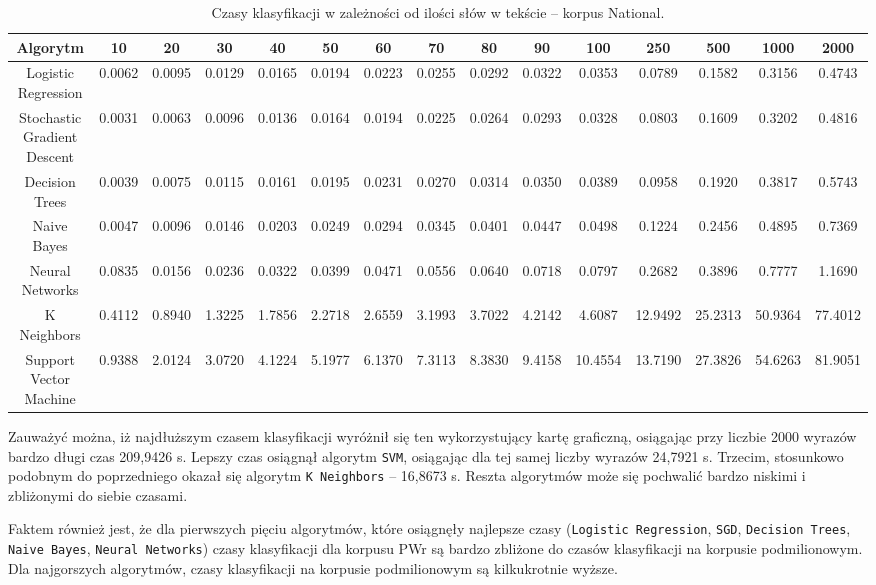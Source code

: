 \begin{landscape}
	\begin{table}[H]
		\centering
		\caption{Czasy klasyfikacji w zależności od ilości słów w tekście -- korpus National.}
		\begin{tabular}{ccccccccccccccc}
			\toprule
			\textbf{Algorytm} & \textbf{10} & \textbf{20} & \textbf{30} & \textbf{40} & \textbf{50} & \textbf{60} & \textbf{70} & \textbf{80} & \textbf{90} & \textbf{100} & \textbf{250} & \textbf{500} & \textbf{1000} & \textbf{2000} \\
			\midrule
			Logistic Regression & 0.0062 & 0.0095 & 0.0129 & 0.0165 & 0.0194 & 0.0223 & 0.0255 & 0.0292 & 0.0322 & 0.0353 & 0.0789 & 0.1582 & 0.3156 & 0.4743 \\
			Stochastic Gradient Descent & 0.0031 & 0.0063 & 0.0096 & 0.0136 & 0.0164 & 0.0194 & 0.0225 & 0.0264 & 0.0293 & 0.0328 & 0.0803 & 0.1609 & 0.3202 & 0.4816 \\
			Decision Trees & 0.0039 & 0.0075 & 0.0115 & 0.0161 & 0.0195 & 0.0231 & 0.0270 & 0.0314 & 0.0350 & 0.0389 & 0.0958 & 0.1920 & 0.3817 & 0.5743 \\
			Naive Bayes & 0.0047 & 0.0096 & 0.0146 & 0.0203 & 0.0249 & 0.0294 & 0.0345 & 0.0401 & 0.0447 & 0.0498 & 0.1224 & 0.2456 & 0.4895 & 0.7369 \\
			Neural Networks & 0.0835 & 0.0156 & 0.0236 & 0.0322 & 0.0399 & 0.0471 & 0.0556 & 0.0640 & 0.0718 & 0.0797 & 0.2682 & 0.3896 & 0.7777 & 1.1690 \\
			K Neighbors & 0.4112 & 0.8940 & 1.3225 & 1.7856 & 2.2718 & 2.6559 & 3.1993 & 3.7022 & 4.2142 & 4.6087 & 12.9492 & 25.2313 & 50.9364 & 77.4012 \\
			Support Vector Machine & 0.9388 & 2.0124 & 3.0720 & 4.1224 & 5.1977 & 6.1370 & 7.3113 & 8.3830 & 9.4158 & 10.4554 & 13.7190 & 27.3826 & 54.6263 & 81.9051 \\
			\bottomrule
		\end{tabular}
	\end{table}
\end{landscape}

Zauważyć można, iż najdłuższym czasem klasyfikacji wyróżnił się ten wykorzystujący kartę graficzną, osiągając przy liczbie 2000 wyrazów bardzo długi czas 209,9426 s. Lepszy czas osiągnął algorytm \texttt{SVM}, osiągając dla tej samej liczby wyrazów 24,7921 s. Trzecim, stosunkowo podobnym do poprzedniego okazał się algorytm \texttt{K Neighbors} -- 16,8673 s. Reszta algorytmów może się pochwalić bardzo niskimi i zbliżonymi do siebie czasami.

Faktem również jest, że dla pierwszych pięciu algorytmów, które osiągnęły najlepsze czasy (\texttt{Logistic Regression}, \texttt{SGD}, \texttt{Decision Trees}, \texttt{Naive Bayes}, \texttt{Neural Networks}) czasy klasyfikacji dla korpusu PWr są bardzo zbliżone do czasów klasyfikacji na korpusie podmilionowym. Dla najgorszych algorytmów, czasy klasyfikacji na korpusie podmilionowym są kilkukrotnie wyższe.

